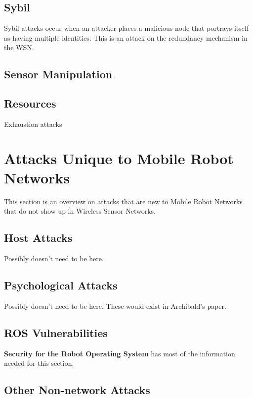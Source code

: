 \subsection{Sybil}
Sybil attacks occur when an attacker places a malicious node that portrays itself as having multiple identities. This is an attack on the redundancy mechanism in the WSN. 
\subsection{Sensor Manipulation}

\subsection{Resources}
Exhaustion attacks
\section{Attacks Unique to Mobile Robot Networks}
This section is an overview on attacks that are new to Mobile Robot Networks that do not show up in Wireless Sensor Networks. 
\subsection{Host Attacks}
Possibly doesn't need to be here. 
\subsection{Psychological Attacks}
Possibly doesn't need to be here. These would exist in Archibald's paper. 
\subsection{ROS Vulnerabilities}
\textbf{Security for the Robot Operating System} has most of the information needed for this section.
\subsection{Other Non-network Attacks}







